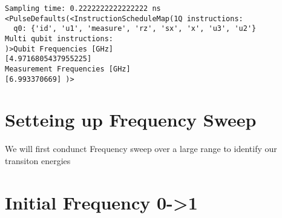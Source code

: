 \hypertarget{4b373e23-a658-4382-b744-95ed4f4b8214}{}
\begin{Shaded}
\begin{Highlighting}[]
\OperatorTok{=}
\end{Highlighting}
\end{Shaded}

\hypertarget{69fe775c-142b-4dcb-b68b-47940c7e72a3}{}
\begin{Shaded}
\begin{Highlighting}[]
\OperatorTok{=}
\NormalTok{(}\SpecialCharTok{\{}\OperatorTok{*}\SpecialCharTok{\}}\NormalTok{) }
\OperatorTok{=}
\end{Highlighting}
\end{Shaded}

\begin{verbatim}
Sampling time: 0.2222222222222222 ns
<PulseDefaults(<InstructionScheduleMap(1Q instructions:
  q0: {'id', 'u1', 'measure', 'rz', 'sx', 'x', 'u3', 'u2'}
Multi qubit instructions:
)>Qubit Frequencies [GHz]
[4.9716805437955225]
Measurement Frequencies [GHz]
[6.993370669] )>
\end{verbatim}

\hypertarget{fd6aa8b0-c714-4255-9b74-a3b750c321e6}{}
\hypertarget{setteing-up-frequency-sweep}{%
\section{Setteing up Frequency
Sweep}\label{setteing-up-frequency-sweep}}

\leavevmode{}%
We will first condunct Frequency sweep over a large range to identify
our transiton energies

\hypertarget{d5d7ed8b-5e53-4b6c-bada-e71c0d60b18e}{}
\hypertarget{initial-frequency-0-1}{%
\section{Initial Frequency
0-\textgreater1}\label{initial-frequency-0-1}}

